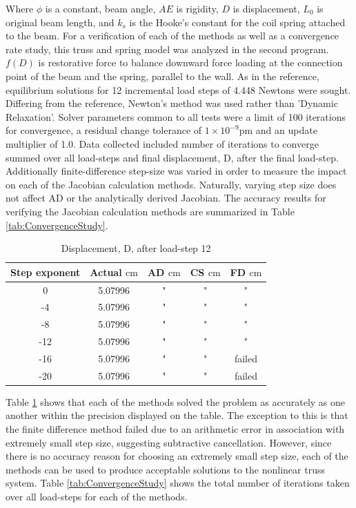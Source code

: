 \documentclass[preprint,12pt]{elsarticle}
\begin{document}
Where $\phi$ is a constant, beam angle, $AE$ is rigidity, $D$ is displacement,
$L_{0}$ is original beam length, and $k_{s}$ is the Hooke's constant for the
coil spring attached to the beam. For a verification of each of the methods as
well as a convergence rate study, this truss and spring model was analyzed in
the second program. $f(D)$ is restorative force to balance downward force
loading at the connection point of the beam and the spring, parallel to the
wall. As in the reference, equilibrium solutions for 12 incremental load steps
of 4.448 Newtons were sought. Differing from the reference, Newton's method was
used rather than 'Dynamic Relaxation'. Solver parameters common to all tests
were a limit of 100 iterations for convergence, a residual change tolerance of
$1\times{10^{-9}} \si{\pico\meter}$ and an update multiplier of 1.0. Data
collected included number of iterations to converge summed over all load-steps
and final displacement, D, after the final load-step. Additionally
finite-difference step-size was varied in order to measure the impact on each
of the Jacobian calculation methods. Naturally, varying step size does not
affect AD or the analytically derived Jacobian. The accuracy results for
verifying the Jacobian calculation methods are summarized in Table
\ref{tab:ConvergenceStudy}. 

\begin{table}[!ht]    
  \centering
        \caption{Displacement, D, after load-step 12} \label{tab:Verification}   
        \begin{tabular}{c c c c c}
         \toprule
         Step exponent & Actual $\si{\centi\meter}$ & AD $\si{\centi\meter}$ & CS $\si{\centi\meter}$ & FD $\si{\centi\meter}$\\ 
        \midrule
        0 & 5.07996 & " & " & "\\
        -4 & 5.07996 & " & " & "\\
        -8 & 5.07996 & " & " & "\\
        -12 & 5.07996 & " & " & " \\
        -16 & 5.07996 & " & " & failed \\
        -20 & 5.07996 & " & " & failed \\
        \bottomrule
    \end{tabular}
\end{table}

Table \ref{tab:Verification} shows that each of the methods solved the problem
as accurately as one another within the precision displayed on the table. The
exception to this is that the finite difference method failed due to an
arithmetic error in association with extremely small step size, suggesting
subtractive cancellation. However, since there is no accuracy reason for
choosing an extremely small step size, each of the methods can be used to
produce acceptable solutions to the nonlinear truss system. Table
\ref{tab:ConvergenceStudy} shows the total number of iterations taken over all
load-steps for each of the methods.
\end{document}
